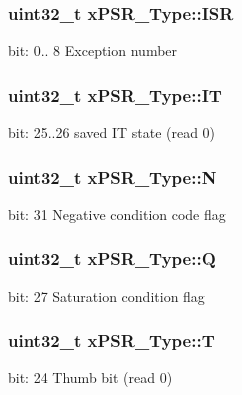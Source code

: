 \subsubsection[{\texorpdfstring{I\+SR}{ISR}}]{\setlength{\rightskip}{0pt plus 5cm}uint32\+\_\+t x\+P\+S\+R\+\_\+\+Type\+::\+I\+SR}\hypertarget{unionxPSR__Type_a3e9120dcf1a829fc8d2302b4d0673970}{}\label{unionxPSR__Type_a3e9120dcf1a829fc8d2302b4d0673970}
bit\+: 0.. 8 Exception number 
\subsubsection[{\texorpdfstring{IT}{IT}}]{\setlength{\rightskip}{0pt plus 5cm}uint32\+\_\+t x\+P\+S\+R\+\_\+\+Type\+::\+IT}\hypertarget{unionxPSR__Type_a3200966922a194d84425e2807a7f1328}{}\label{unionxPSR__Type_a3200966922a194d84425e2807a7f1328}
bit\+: 25..26 saved IT state (read 0) 
\subsubsection[{\texorpdfstring{N}{N}}]{\setlength{\rightskip}{0pt plus 5cm}uint32\+\_\+t x\+P\+S\+R\+\_\+\+Type\+::N}\hypertarget{unionxPSR__Type_a2db9a52f6d42809627d1a7a607c5dbc5}{}\label{unionxPSR__Type_a2db9a52f6d42809627d1a7a607c5dbc5}
bit\+: 31 Negative condition code flag 
\subsubsection[{\texorpdfstring{Q}{Q}}]{\setlength{\rightskip}{0pt plus 5cm}uint32\+\_\+t x\+P\+S\+R\+\_\+\+Type\+::Q}\hypertarget{unionxPSR__Type_add7cbd2b0abd8954d62cd7831796ac7c}{}\label{unionxPSR__Type_add7cbd2b0abd8954d62cd7831796ac7c}
bit\+: 27 Saturation condition flag 
\subsubsection[{\texorpdfstring{T}{T}}]{\setlength{\rightskip}{0pt plus 5cm}uint32\+\_\+t x\+P\+S\+R\+\_\+\+Type\+::T}\hypertarget{unionxPSR__Type_a7eed9fe24ae8d354cd76ae1c1110a658}{}\label{unionxPSR__Type_a7eed9fe24ae8d354cd76ae1c1110a658}
bit\+: 24 Thumb bit (read 0) 
